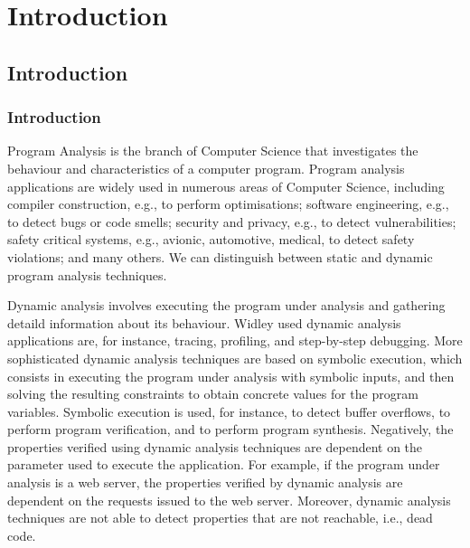 \part{Introduction}
\chapter{Introduction}
\section{Introduction}

Program Analysis is the branch of Computer Science that investigates the behaviour
and characteristics of a computer program. Program analysis applications are widely
used in numerous areas of Computer Science, including compiler construction,
e.g., to perform optimisations; software engineering, e.g., to detect bugs or
code smells; security and privacy, e.g., to detect vulnerabilities; safety
critical systems, e.g., avionic, automotive, medical, to detect safety
violations; and many others.
We can distinguish between static and dynamic program analysis techniques.

Dynamic analysis involves executing the program under analysis and gathering
detaild information about its behaviour. Widley used dynamic analysis applications
are, for instance, tracing, profiling, and step-by-step debugging. More sophisticated dynamic
analysis techniques are based on symbolic execution, which consists in executing
the program under analysis with symbolic inputs, and then solving the resulting
constraints to obtain concrete values for the program variables. Symbolic execution
is used, for instance, to detect buffer overflows, to perform program verification,
and to perform program synthesis.
Negatively, the properties verified using dynamic analysis techniques 
are dependent on the parameter used to execute the application. For example, if the
program under analysis is a web server, the properties verified by dynamic analysis
are dependent on the requests issued to the web server. Moreover, dynamic analysis
techniques are not able to detect properties that are not reachable, i.e., dead code.


